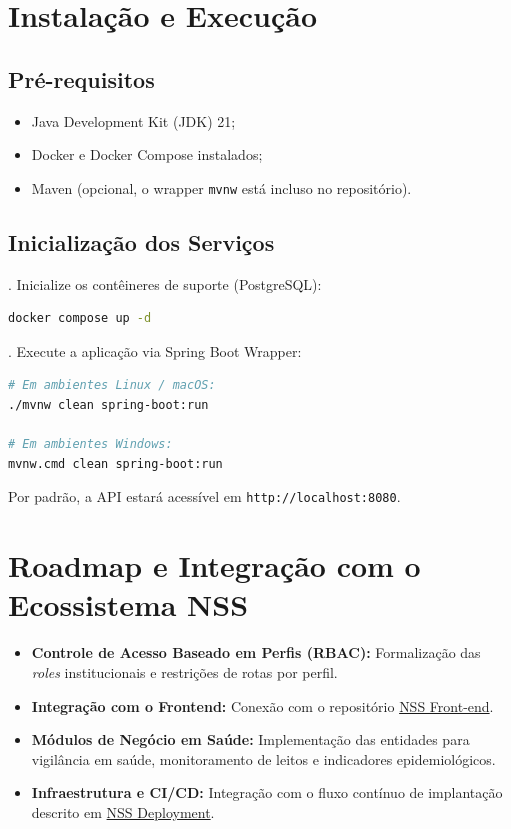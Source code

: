 \documentclass[12pt,a4paper]{article}
\begin{document}
\section{Instalação e Execução}

\subsection{Pré-requisitos}
\begin{itemize}[noitemsep]
\item Java Development Kit (JDK) 21;
\item Docker e Docker Compose instalados;
\item Maven (opcional, o wrapper \texttt{mvnw} está incluso no repositório).
\end{itemize}

\subsection{Inicialização dos Serviços}

. Inicialize os contêineres de suporte (PostgreSQL):
\begin{lstlisting}[language=bash, numbers=none]
docker compose up -d
\end{lstlisting}

. Execute a aplicação via Spring Boot Wrapper:
\begin{lstlisting}[language=bash, numbers=none]
# Em ambientes Linux / macOS:
./mvnw clean spring-boot:run

# Em ambientes Windows:
mvnw.cmd clean spring-boot:run
\end{lstlisting}

Por padrão, a API estará acessível em \texttt{http://localhost:8080}.

\section{Roadmap e Integração com o Ecossistema NSS}

\begin{itemize}
\item \textbf{Controle de Acesso Baseado em Perfis (RBAC):} Formalização das \textit{roles} institucionais e restrições de rotas por perfil.
\item \textbf{Integração com o Frontend:} Conexão com o repositório \href{https://github.com/Zadoque/NSS-front-end}{NSS Front-end}.
\item \textbf{Módulos de Negócio em Saúde:} Implementação das entidades para vigilância em saúde, monitoramento de leitos e indicadores epidemiológicos.
\item \textbf{Infraestrutura e CI/CD:} Integração com o fluxo contínuo de implantação descrito em \href{https://github.com/Zadoque/NSS-deployment}{NSS Deployment}.
\end{itemize}
\end{document}
